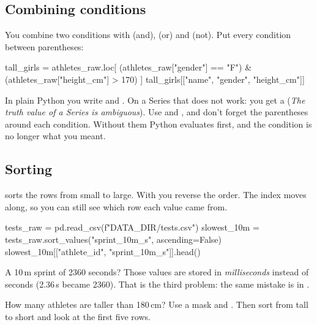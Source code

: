 \documentclass[11pt,a4paper]{article}
\begin{document}
\subsection{Combining conditions}

You combine two conditions with \code{\&} (and), \code{|} (or) and
\code{\textasciitilde} (not). Put every condition between parentheses:

\begin{python}
tall_girls = athletes_raw.loc[
    (athletes_raw["gender"] == "F") & (athletes_raw["height_cm"] > 170)
]
tall_girls[["name", "gender", "height_cm"]]
\end{python}

\begin{watchout}
In plain Python you write  and . On a Series that
does not work: you get a  (\emph{The truth value of a
Series is ambiguous}). Use \code{\&} and \code{|}, and don't forget the
parentheses around each condition. Without them Python evaluates
\code{\&} first, and the condition is no longer what you meant.
\end{watchout}

\subsection{Sorting}

 sorts the rows from small to large. With
 you reverse the order. The index moves along, so
you can still see which row each value came from.

\begin{python}
tests_raw = pd.read_csv(f"{DATA_DIR}/tests.csv")
slowest_10m = tests_raw.sort_values("sprint_10m_s", ascending=False)
slowest_10m[["athlete_id", "sprint_10m_s"]].head()
\end{python}

A 10\,m sprint of 2360 seconds? Those values are stored in
\emph{milliseconds} instead of seconds (2.36\,s became 2360). That is
the third problem: the same mistake is in .

\begin{tryit}
How many athletes are taller than 180\,cm? Use a mask and
. Then sort  from tall to short and
look at the first five rows.
\end{tryit}

\end{document}
